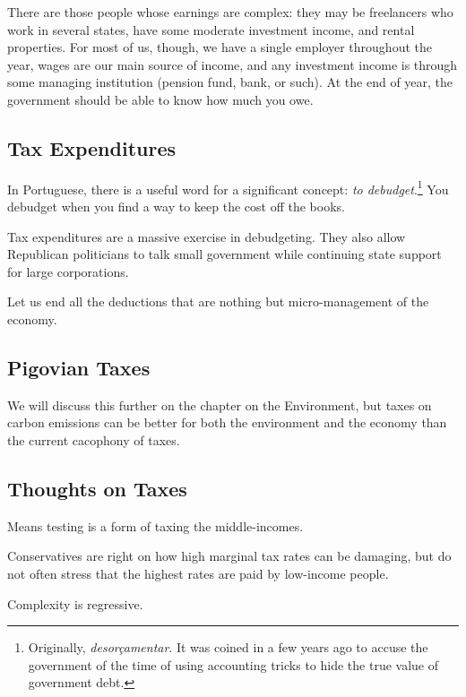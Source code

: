 There are those people whose earnings are complex: they may be freelancers who
work in several states, have some moderate investment income, and rental
properties. For most of us, though, we have a single employer throughout the
year, wages are our main source of income, and any investment income is through
some managing institution (pension fund, bank, or such). At the end of year,
the government should be able to know how much you owe.

\subsection{Tax Expenditures}

In Portuguese, there is a useful word for a significant concept: \emph{to
debudget}.\footnote{Originally, \emph{desorçamentar}. It was coined in a few
years ago to accuse the government of the time of using accounting tricks to
hide the true value of government debt.} You debudget when you find a way to
keep the cost off the books.

Tax expenditures are a massive exercise in debudgeting. They also allow
Republican politicians to talk small government while continuing state support
for large corporations.

Let us end all the deductions that are nothing but micro-management of the
economy.

\subsection{Pigovian Taxes}

We will discuss this further on the chapter on the Environment, but taxes on
carbon emissions can be better for both the environment and the economy than
the current cacophony of taxes.

\subsection{Thoughts on Taxes}

\thought Means testing is a form of taxing the middle-incomes.

\thought Conservatives are right on how high marginal tax rates can be
damaging, but do not often stress that the highest rates are paid by low-income
people.

\thought Complexity is regressive.



